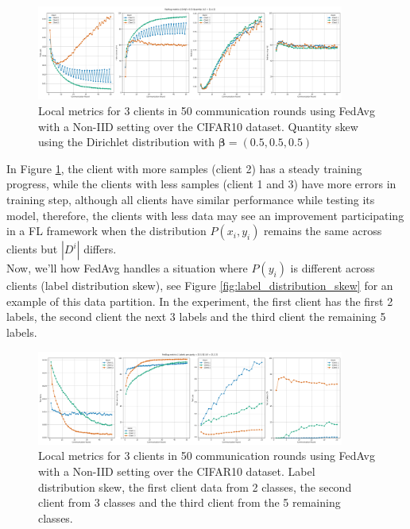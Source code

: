 \begin{figure}[H]
  \centering
  \includegraphics[width=0.9\textwidth]{figures/2-Federated_Learning/FedAvg_Dir_05_Quantity_CIFAR10_242.png}
  \caption{Local metrics for 3 clients in 50 communication rounds using FedAvg with a Non-IID setting over the CIFAR10 dataset. Quantity skew using the Dirichlet distribution with $\boldsymbol{\beta} = (0.5, 0.5, 0.5)$ }
  \label{fig:FedAvg_Quantity_Dirichlet_05}
\end{figure}

In Figure \ref{fig:FedAvg_Quantity_Dirichlet_05}, the client with more samples (client 2) has a steady training progress, while the clients with less samples (client 1 and 3) have more errors in training step, although all clients have similar performance while testing its model, therefore, the clients with less data may see an improvement participating in a FL framework when the distribution $P(x_i, y_i)$ remains the same across clients but $|D^i|$ differs.\\
Now, we'll how FedAvg handles a situation where $P(y_i)$ is different across clients (label distribution skew), see Figure \ref{fig:label_distribution_skew} for an example of this data partition. In the experiment, the first client has the first 2 labels, the second client the next 3 labels and the third client the remaining 5 labels.

\begin{figure}[H]
  \centering
  \includegraphics[width=0.9\textwidth]{figures/2-Federated_Learning/FedAvg_Label_Per_Party_235.png}
  \caption{Local metrics for 3 clients in 50 communication rounds using FedAvg with a Non-IID setting over the CIFAR10 dataset. Label distribution skew, the first client data from 2 classes, the second client from 3 classes and the third client from the 5 remaining classes.}
  \label{fig:FedAvg_Labels_Per_Party}
\end{figure}

